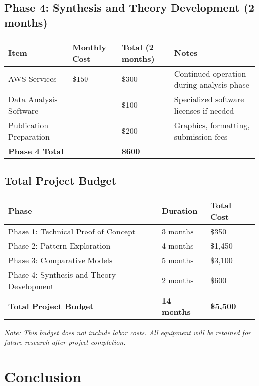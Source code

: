 \documentclass[12pt,letterpaper]{article}
\begin{document}
\subsection{Phase 4: Synthesis and Theory Development (2 months)}
\begin{table}[H]
\centering
\begin{tabular}{@{}llll@{}}
\toprule
\textbf{Item} & \textbf{Monthly Cost} & \textbf{Total (2 months)} & \textbf{Notes} \\
\midrule
AWS Services & \$150 & \$300 & Continued operation during analysis phase \\
Data Analysis Software & - & \$100 & Specialized software licenses if needed \\
Publication Preparation & - & \$200 & Graphics, formatting, submission fees \\
\midrule
\textbf{Phase 4 Total} & & \textbf{\$600} & \\
\bottomrule
\end{tabular}
\end{table}

\subsection{Total Project Budget}
\begin{table}[H]
\centering
\begin{tabular}{@{}lll@{}}
\toprule
\textbf{Phase} & \textbf{Duration} & \textbf{Total Cost} \\
\midrule
Phase 1: Technical Proof of Concept & 3 months & \$350 \\
Phase 2: Pattern Exploration & 4 months & \$1,450 \\
Phase 3: Comparative Models & 5 months & \$3,100 \\
Phase 4: Synthesis and Theory Development & 2 months & \$600 \\
\midrule
\textbf{Total Project Budget} & \textbf{14 months} & \textbf{\$5,500} \\
\bottomrule
\end{tabular}
\end{table}

\textit{Note: This budget does not include labor costs. All equipment will be retained for future research after project completion.}

\section{Conclusion}
\end{document}

